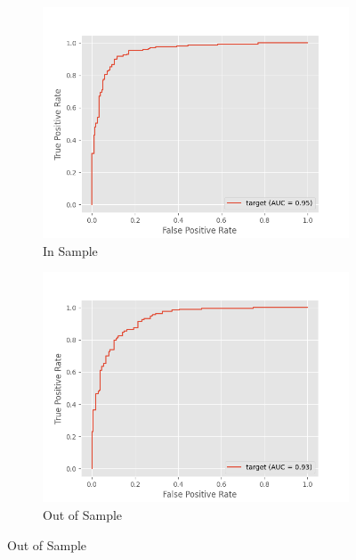 



\begin{figure}[!bp]
    \caption{Receiver Operator Curves}\label{fig:roc}
    \centering
    \begin{subfigure}[b]{0.49\textwidth}
        \caption{In Sample}
        \centering
        \includegraphics[width=\textwidth]{plots/roc-is-1.png}
    \end{subfigure}
    \begin{subfigure}[b]{0.49\textwidth}
        \caption{Out of Sample}
        \centering
        \includegraphics[width=\textwidth]{plots/roc-oos-1.png}
    \end{subfigure}
\end{figure}


